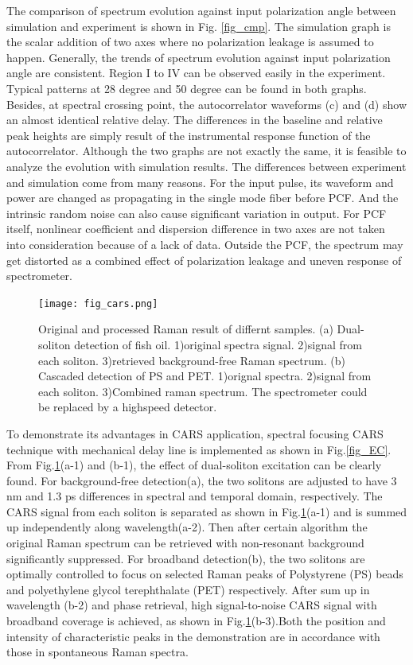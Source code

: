 \documentclass{osa-article}
\begin{document}
The comparison of spectrum evolution against input polarization angle between simulation and experiment is shown in Fig. \ref{fig_cmp}. The simulation graph is the scalar addition of two axes where no polarization leakage is assumed to happen. Generally, the trends of spectrum evolution against input polarization angle are consistent. Region I to IV can be observed easily in the experiment. Typical patterns at 28 degree and 50 degree can be found in both graphs. Besides, at spectral crossing point, the autocorrelator waveforms (c) and (d) show an almost identical relative delay. The differences in the baseline and relative peak heights are simply result of the instrumental response function of the autocorrelator. Although the two graphs are not exactly the same, it is feasible to analyze the evolution with simulation results. The differences between experiment and simulation come from many reasons. For the input pulse, its waveform and power are changed as propagating in the single mode fiber before PCF. And the intrinsic random noise can also cause significant variation in output\cite{dudley_supercontinuum_2006}. For PCF itself, nonlinear coefficient and dispersion difference in two axes are not taken into consideration because of a lack of data. Outside the PCF, the spectrum may get distorted as a combined effect of polarization leakage and uneven response of spectrometer.


\begin{figure}[htbp]
    \centering%
    \texttt{[image: fig\_cars.png]}
    \caption{Original and processed Raman result of differnt samples. (a) Dual-soliton detection of fish oil. 1)original spectra signal. 2)signal from each soliton. 3)retrieved background-free Raman spectrum. (b) Cascaded detection of PS and PET. 1)orignal spectra. 2)signal from each soliton. 3)Combined raman spectrum. The spectrometer could be replaced by a highspeed detector.}
    \label{fig_CARS}\vspace*{-6pt}
\end{figure}

To demonstrate its advantages in CARS application, spectral focusing CARS technique with mechanical delay line is implemented as shown in Fig.\ref{fig_EC}. From Fig.\ref{fig_CARS}(a-1) and (b-1), the effect of dual-soliton excitation can be clearly found. For background-free detection(a), the two solitons are adjusted to have 3 nm and 1.3 ps differences in spectral and temporal domain, respectively. The CARS signal from each soliton is separated as shown in Fig.\ref{fig_CARS}(a-1) and is summed up independently along wavelength(a-2). Then after certain algorithm \cite{chen_dual-soliton_2016}the original Raman spectrum can be retrieved with non-resonant background significantly suppressed. For broadband detection(b), the two solitons are optimally controlled to focus on selected Raman peaks of Polystyrene (PS) beads and polyethylene glycol terephthalate (PET) respectively. After sum up in wavelength (b-2) and phase retrieval, high signal-to-noise CARS signal with broadband coverage is achieved, as shown in Fig.\ref{fig_CARS}(b-3).Both the position and intensity of characteristic peaks in the demonstration are in accordance with those in spontaneous Raman spectra.  
\end{document}

